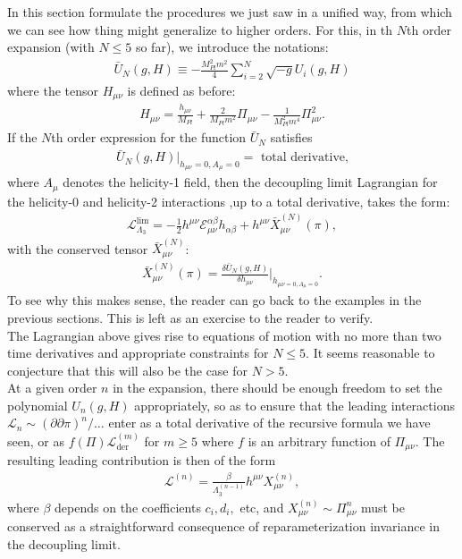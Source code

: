 \documentclass{book}
\theoremstyle{definition}
\newcommand{\p}{\partial}
\newcommand{\lag}{\mathcal{L}}
\newcommand{\al}{\alpha}
\newcommand{\be}{\beta}
\newcommand{\f}[2]{\frac{#1}{#2}}
\begin{document}
In this section formulate the procedures we just saw in a unified way, from which we can see how thing might generalize to higher orders. For this, in th $N$th order expansion (with $N \leq 5$ so far), we introduce the notations:
\begin{align}
\bar{U}_N(g,H) \equiv -\f{M_{Pl}^2m^2}{4}\sum^N_{i=2}\sqrt{-g}U_i(g,H)
\end{align}
where the tensor $H_{\mu\nu}$ is defined as before:
\begin{align}
H_{\mu\nu} = \f{h_{\mu\nu}}{M_{Pl}} + \f{2}{M_{Pl}m^2}\Pi_{\mu\nu} - \f{1}{M^2_{Pl} m^4} \Pi^2_{\mu\nu}.
\end{align}
If the $N$th order expression for the function $\bar{U}_N$ satisfies
\begin{align}
\bar{U}_N(g,H) \bigg\vert_{h_{\mu\nu} = 0, A_\mu = 0} = \text{ total derivative,}
\end{align}
where $A_\mu$ denotes the helicity-1 field, then the decoupling limit Lagrangian for the helicity-0 and helicity-2 interactions ,up to a total derivative, takes the form:
\begin{align}
\lag^\text{lim}_{\Lambda_3} = -\f{1}{2}h^{\mu\nu}\mathcal{E}^{\al\be}_{\mu\nu}h_{\al\be} + h^{\mu\nu}\bar{X}^{(N)}_{\mu\nu}(\pi),
\end{align}
with the conserved tensor $\bar{X}_{\mu\nu}^{(N)}$:
\begin{align}
\bar{X}^{(N)}_{\mu\nu}(\pi) = \f{\delta \bar{U}_N(g,H)}{\delta h_{\mu\nu}}\bigg\vert_{h_{\mu\nu= 0,A_\mu = 0}}.
\end{align}
To see why this makes sense, the reader can go back to the examples in the previous sections. This is left as an exercise to the reader to verify. \\

The Lagrangian above gives rise to equations of motion with no more than two time derivatives and appropriate constraints for $N \leq 5$. It seems reasonable to conjecture that this will also be the case for $N > 5$.\\

At a given order $n$ in the expansion, there should be enough freedom to set the polynomial $U_n(g,H)$ appropriately, so as to ensure that the leading interactions $\lag_n \sim (\p \p \pi)^n/\dots$ enter as a total derivative of the recursive formula we have seen, or as $f(\Pi)\lag_\text{der}^{(m)}$ for $m \geq 5$ where $f$ is an arbitrary function of $\Pi_{\mu\nu}$. The resulting leading contribution is then of the form
\begin{align}
\lag^{(n)} = \f{\beta}{\Lambda_3^{(n-1)}} h^{\mu\nu}X_{\mu\nu}^{(n)},
\end{align}
where $\beta$ depends on the coefficients $c_i,d_i,$ etc, and $X_{\mu\nu}^{(n)} \sim \Pi^n_{\mu\nu}$ must be conserved as a straightforward consequence of reparameterization invariance in the decoupling limit. \\
\end{document}
